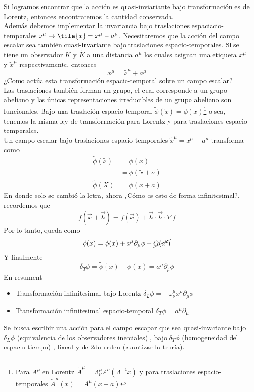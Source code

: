 \documentclass[../main.tex]{subfiles}
\begin{document}
Si logramos encontrar que la acción es quasi-inviariante bajo transformación es de Lorentz, entonces encontraremos la cantidad conservada. \\
Además debemos implementar la invariancia bajo traslaciones espaciacio-temporales $x^\mu \rightarrow \tile{x}=x^\mu - a^\mu$. Necesitaremos que la acción del campo escalar sea también cuasi-invariante bajo traslaciones espacio-temporales.
Si se tiene un observador $K$ y $\tilde{K}$ a una distancia $a^\mu$ los cuales asignan una etiqueta $x^\mu$ y $\tilde{x}^\mu$ respectivamente, entonces  
\begin{equation*}
  x^\mu = \tilde{x}^\mu + a^\mu
\end{equation*}
¿Como actúa esta transformación espacio-temporal sobre un campo escalar? \\
Las traslaciones también forman un grupo, el cual corresponde a un grupo abeliano y las únicas representaciones irreducibles de un grupo abeliano son funcionales. Bajo una traslación espacio-temporal $\tilde{\phi}(\tilde{x})=\phi(x)$\footnote{Para $A^\mu$ en Lorentz $\tilde{{A}}^\mu = \Lambda_\nu^\mu A^\nu(\Lambda^{-1}x)$ y para traslaciones espacio-temporales $\tilde{{A}}^\mu (x) = A^\mu(x+a)$} o sea, tenemos la misma ley de transformación para Lorentz y para traslaciones espacio-temporales. \\
Un campo escalar bajo traslaciones espacio-temporales $\tilde{x}^\mu =x^\mu - a^\mu$ transforma como
\begin{align*}
  \tilde{\phi}(\tilde{x}) & = \phi (x) \\
  & = \phi (\tilde{x}+a) \\
  \tilde{\phi}(X) & = \phi(x+a)
\end{align*}
En donde solo se cambió la letra, ahora ¿Cómo es esto de forma infinitesimal?, recordemos que
\begin{equation*}
  f(\vec{x}+\vec{h}) = f(\vec{x}) + \vec{h}\cdot \vec{h}\cdot \nabla f
\end{equation*}
Por lo tanto, queda como
\begin{equation}
  \tilde{\phi} (x) = \phi(x) + a^\mu \partial_\mu \phi + \cancel{O(a^2)}
\end{equation}
Y finalmente
\begin{equation}
  \delta_T \phi = \tilde{\phi}(x)-\phi(x) = a^\mu\partial_\mu \phi
\end{equation}
En resument
\begin{itemize}
  \item Transformación infinitesimal bajo Lorentz $\delta_L\phi = -\omega^\mu_\nu x^\nu \partial_\mu \phi$
  \item Transformación infinitesimal espacio-temporal $\delta_T \phi = a^\mu \partial_\mu$
\end{itemize}
  Se busca escribir una acción para el campo escapar que sea quasi-invariante bajo $\delta_L\phi$ (equivalencia de los observadores inerciales) , bajo $\delta_T\phi$ (homogeneidad del espacio-tiempo) , lineal y de 2do orden (cuantizar la teoría).
\end{document}
